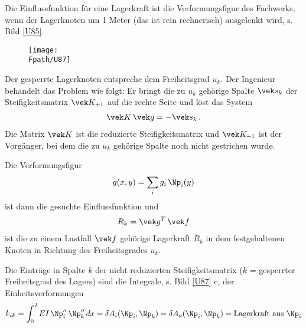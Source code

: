 {%
Die Einflussfunktion f\"{u}r eine Lagerkraft ist die Verformungsfigur des Fachwerks, wenn der Lagerknoten um 1 Meter (das ist rein rechnerisch) ausgelenkt wird, s. Bild \ref{U85}.
\begin{figure}[tbp]
\centering
\texttt{[image: \\Fpath/U87]}
%
\end{figure}%
Der gesperrte Lagerknoten entspreche dem Freiheitsgrad $u_k$. Der Ingenieur behandelt das Problem wie folgt: Er bringt die zu $u_k$ geh\"{o}rige Spalte $\vek s_k$ der Steifigkeitsmatrix $\vek K_{+1}$ auf die rechte Seite und l\"{o}st das System
\begin{align}
\vek K\,\vek g = - \vek s_k\,.
\end{align}
Die Matrix $\vek K$ ist die reduzierte Steifigkeitsmatrix und $\vek K_{+1}$ ist der Vorg\"{a}nger, bei dem die zu $u_k$ geh\"{o}rige Spalte noch nicht gestrichen wurde.

Die Verformungsfigur
\begin{align}
g(x,y) = \sum_i g_{i}\,\Np_i(y)
\end{align}
ist dann die gesuchte Einflussfunktion und
\begin{align}
R_k = \vek g^T\,\vek f
\end{align}
ist die zu einem Lastfall $\vek f$ geh\"{o}rige Lagerkraft $R_k$ in dem festgehaltenen Knoten in Richtung des Freiheitsgrades $u_k$.

\begin{remark}
Die Eintr\"{a}ge in Spalte $k$ der nicht reduzierten Steifigkeitsmatrix ($k$ = gesperrter Freiheitsgrad des Lagers) sind die Integrale, s. Bild \ref{U87} c, der Einheitsverformungen
\begin{align}
k_{ik} = \int_0^{\,l} EI\,\Np_i''\,\Np_k''\,dx = \delta A_i(\Np_i,\Np_k) = \delta A_a(\Np_i,\Np_k) = \text{Lagerkraft aus $\Np_i$}
\end{align}
\end{remark}

}

